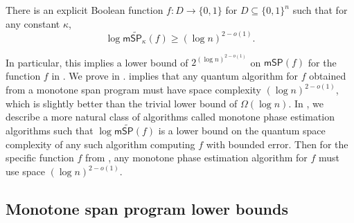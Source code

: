 \documentclass{toc}
\begin{document}
\begin{theorem}\label{thm:explicit}
There is an explicit Boolean function $f:D\rightarrow\{0,1\}$ for $D\subseteq \{0,1\}^n$ such that for any constant $\kappa$,
$$\log\mathsf{m}\widetilde{\mathsf{SP}}_{\kappa}(f)\geq (\log n)^{2-o(1)}.$$
\end{theorem}
In particular, this implies a lower bound of $2^{(\log n)^{2-o(1)}}$ on $\mathsf{mSP}(f)$ for the function $f$ in . 
We prove  in . 
 implies that any quantum algorithm for $f$ obtained from a monotone span program must have space complexity $(\log n)^{2-o(1)}$, which is slightly better than the trivial lower bound of $\Omega(\log n)$. In , we describe a more natural class of algorithms called monotone phase estimation algorithms such that $\log\mathsf{m}\widetilde{\mathsf{SP}}(f)$ is a lower bound on the quantum space complexity of any such algorithm computing $f$ with bounded error. Then for the specific function $f$ from , any monotone phase estimation algorithm for $f$ must use space $(\log n)^{2-o(1)}$. 


\subsection{Monotone span program lower bounds}\label{sec:monotone-lower-bounds}
\end{document}
